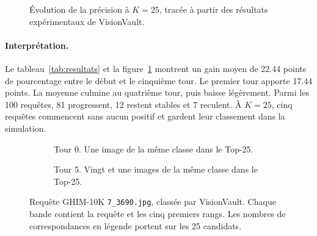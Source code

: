 \begin{figure}[ht]
  \centering
  \caption{Évolution de la précision à \(K=25\), tracée à partir des résultats expérimentaux de VisionVault.}
  \label{fig:precision}
\end{figure}

\clearpage
\paragraph{Interprétation.}
Le tableau~\ref{tab:resultats} et la figure~\ref{fig:precision} montrent un gain moyen de \num{22.44} points de pourcentage entre le début et le cinquième tour. Le premier tour apporte \num{17.44} points. La moyenne culmine au quatrième tour, puis baisse légèrement. Parmi les 100 requêtes, 81 progressent, 12 restent stables et 7 reculent. À \(K=25\), cinq requêtes commencent sans aucun positif et gardent leur classement dans la simulation.

\begin{figure}[ht]
  \centering
  \begin{subfigure}{0.98\linewidth}
    \centering
    \caption{Tour 0. Une image de la même classe dans le Top-25.}
  \end{subfigure}\par\medskip
  \begin{subfigure}{0.98\linewidth}
    \centering
    \caption{Tour 5. Vingt et une images de la même classe dans le Top-25.}
  \end{subfigure}
  \caption{Requête GHIM-10K \texttt{7\_3690.jpg}, classée par VisionVault. Chaque bande contient la requête et les cinq premiers rangs. Les nombres de correspondances en légende portent sur les 25 candidats.}
  \label{fig:retrieval}
\end{figure}

